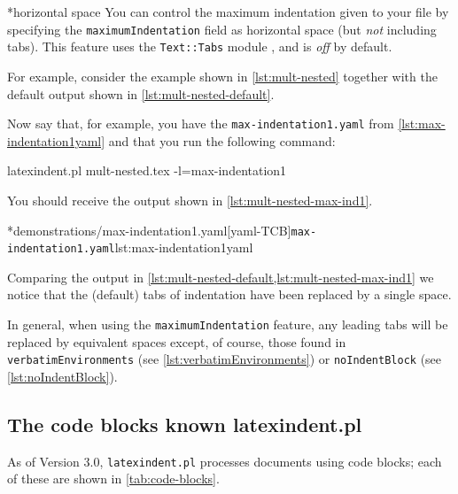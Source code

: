*{horizontal space}
	You can control the maximum indentation given to your file
	by%
	 specifying the
	\texttt{maximumIndentation} field as horizontal space (but \emph{not} including
	tabs). This feature uses the \texttt{Text::Tabs} module \cite{texttabs}, and
	is \emph{off} by default.

	For example, consider the example shown in \cref{lst:mult-nested} together with the
	default output shown in \cref{lst:mult-nested-default}.

        \begin{cmhtcbraster}[raster column skip=.1\linewidth]
        \end{cmhtcbraster}

	Now say that, for example, you have the \texttt{max-indentation1.yaml} from
	\cref{lst:max-indentation1yaml} and that you run the following command:
	\begin{commandshell}
latexindent.pl mult-nested.tex -l=max-indentation1
    \end{commandshell}
	You should receive the output shown in \cref{lst:mult-nested-max-ind1}.

        \begin{cmhtcbraster}
		\cmhlistingsfromfile[style=yaml-LST]*{demonstrations/max-indentation1.yaml}[yaml-TCB]{\texttt{max-indentation1.yaml}}{lst:max-indentation1yaml}
        \end{cmhtcbraster}

	Comparing the output in \cref{lst:mult-nested-default,lst:mult-nested-max-ind1} we notice that the (default) tabs of
	indentation have been replaced by a single space.

	In general, when using the \texttt{maximumIndentation} feature, any leading tabs will be
	replaced by equivalent spaces except, of course, those found in \texttt{verbatimEnvironments} (see \vref{lst:verbatimEnvironments})
	or \texttt{noIndentBlock} (see \vref{lst:noIndentBlock}).

\subsection{The code blocks known latexindent.pl}\label{subsubsec:code-blocks}
	As of Version 3.0, \texttt{latexindent.pl} processes documents using code blocks; each of
	these are shown in \cref{tab:code-blocks}.

